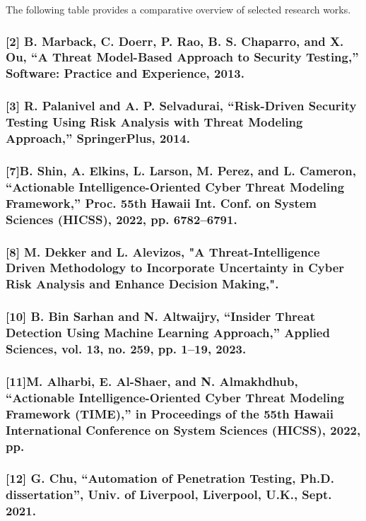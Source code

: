 \documentclass[12pt,a4paper]{report}
\begin{document}
The following table provides a comparative overview of selected research works.

\subsubsection{[2] B. Marback, C. Doerr, P. Rao, B. S. Chaparro, and X. Ou, “A Threat Model-Based Approach to Security Testing,” Software: Practice and Experience, 2013.}

\subsubsection{[3] R. Palanivel and A. P. Selvadurai, “Risk-Driven Security Testing Using Risk Analysis with Threat Modeling Approach,” SpringerPlus, 2014.}

\subsubsection{[7]B. Shin, A. Elkins, L. Larson, M. Perez, and L. Cameron, “Actionable Intelligence-Oriented Cyber Threat Modeling Framework,” Proc. 55th Hawaii Int. Conf. on System Sciences (HICSS), 2022, pp. 6782–6791.}

\subsubsection{[8] M. Dekker and L. Alevizos, "A Threat-Intelligence Driven Methodology to Incorporate Uncertainty in Cyber Risk Analysis and Enhance Decision Making,".}

\subsubsection{[10] B. Bin Sarhan and N. Altwaijry, “Insider Threat Detection Using Machine Learning Approach,” Applied Sciences, vol. 13, no. 259, pp. 1–19, 2023.}

\subsubsection{[11]M. Alharbi, E. Al-Shaer, and N. Almakhdhub, “Actionable Intelligence-Oriented Cyber Threat Modeling Framework (TIME),” in Proceedings of the 55th Hawaii International Conference on System Sciences (HICSS), 2022, pp.}

\subsubsection{[12] G. Chu, “Automation of Penetration Testing, Ph.D. dissertation”, Univ. of Liverpool, Liverpool, U.K., Sept. 2021.}
\end{document}
